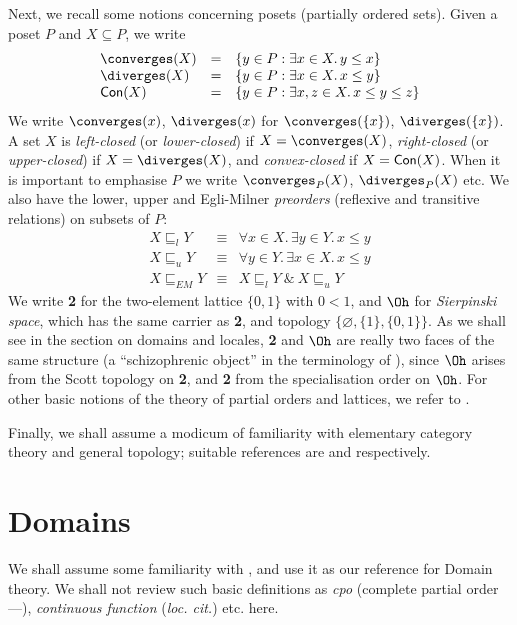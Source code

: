 Next, we recall some notions concerning posets (partially ordered sets).
Given a poset $P$ and $X \subseteq P$, we write
\[ \begin{array}{lcl}
\converges (X) & = & \{ y \in P : \exists x \in X. \, y \leq x \} \\
\diverges (X) & = & \{ y \in P : \exists x \in X. \, x \leq y \} \\
{\sf Con}(X) & = & \{ y \in P : \exists x, z \in X. \, x \leq y \leq z \}
\end{array} \]
We write $\converges (x)$, $\diverges (x)$ for $\converges (\{ x \} )$, $\diverges (\{ x \} )$.
A set $X$ is {\it left-closed} (or {\it lower-closed}) if $X = \converges (X)$,  {\it right-closed} (or {\it upper-closed}) if $X = \diverges (X)$, and {\it convex-closed} if $X = {\sf Con}(X)$.
When it is important to emphasise $P$ we write $\converges_{P}(X)$, $\diverges_{P}(X)$ etc.
We also have the lower, upper and Egli-Milner {\it preorders} (reflexive and transitive relations) on subsets of $P$:
\[ \begin{array}{lcl}
X \sqsubseteq_{l} Y & \equiv & \forall x \in X. \, \exists y \in Y. \, x \leq y   \\
X \sqsubseteq_{u} Y & \equiv & \forall y \in Y. \, \exists x \in X. \, x \leq y \\
X \sqsubseteq_{EM} Y & \equiv & X \sqsubseteq_{l} Y  \: \& \: X \sqsubseteq_{u} Y 
\end{array} \]
We write {\bf 2} for the two-element lattice $\{ 0, 1 \}$ with $0 < 1$, and $\Oh$ for {\em Sierpinski space}, which has the same carrier as {\bf 2}, and topology $\{ \varnothing, \{ 1 \} , \{ 0, 1 \} \}$.
As we shall see in the section on domains and locales, {\bf 2} and $\Oh$ are 
really two faces of the same structure (a ``schizophrenic object'' in the 
terminology of \cite[Chapter 6]{Joh82}), since $\Oh$ arises from the Scott topology on {\bf 2}, and {\bf 2} from the specialisation order on $\Oh$.
For other basic notions of the theory of partial orders and lattices, we refer to \cite{Compend,Joh82}.

Finally, we shall assume a modicum of familiarity with elementary category theory and general topology; suitable references are \cite{Mac71} and \cite{Dug66} respectively.
\section{Domains}
We shall assume some familiarity with \cite{PloLN}, and use it as our reference for Domain theory.
We shall not review such basic definitions as {\it cpo} (complete partial order---\cite[Chapter 1 p.\  7]{PloLN}), {\it continuous function} ({\it loc. cit.}) etc. here.

